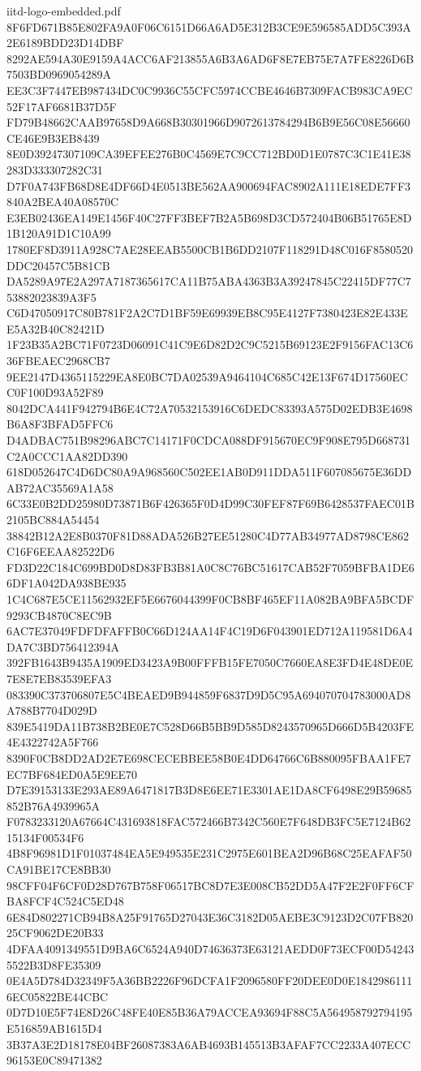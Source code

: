 \begin{filecontents*}[overwrite]{iitd-logo-embedded.pdf}
8F6FD671B85E802FA9A0F06C6151D66A6AD5E312B3CE9E596585ADD5C393A2E6189BDD23D14DBF
8292AE594A30E9159A4ACC6AF213855A6B3A6AD6F8E7EB75E7A7FE8226D6B7503BD0969054289A
EE3C3F7447EB987434DC0C9936C55CFC5974CCBE4646B7309FACB983CA9EC52F17AF6681B37D5F
FD79B48662CAAB97658D9A668B30301966D9072613784294B6B9E56C08E56660CE46E9B3EB8439
8E0D39247307109CA39EFEE276B0C4569E7C9CC712BD0D1E0787C3C1E41E38283D333307282C31
D7F0A743FB68D8E4DF66D4E0513BE562AA900694FAC8902A111E18EDE7FF3840A2BEA40A08570C
E3EB02436EA149E1456F40C27FF3BEF7B2A5B698D3CD572404B06B51765E8D1B120A91D1C10A99
1780EF8D3911A928C7AE28EEAB5500CB1B6DD2107F118291D48C016F8580520DDC20457C5B81CB
DA5289A97E2A297A7187365617CA11B75ABA4363B3A39247845C22415DF77C753882023839A3F5
C6D47050917C80B781F2A2C7D1BF59E69939EB8C95E4127F7380423E82E433EE5A32B40C82421D
1F23B35A2BC71F0723D06091C41C9E6D82D2C9C5215B69123E2F9156FAC13C636FBEAEC2968CB7
9EE2147D4365115229EA8E0BC7DA02539A9464104C685C42E13F674D17560ECC0F100D93A52F89
8042DCA441F942794B6E4C72A70532153916C6DEDC83393A575D02EDB3E4698B6A8F3BFAD5FFC6
D4ADBAC751B98296ABC7C14171F0CDCA088DF915670EC9F908E795D668731C2A0CCC1AA82DD390
618D052647C4D6DC80A9A968560C502EE1AB0D911DDA511F607085675E36DDAB72AC35569A1A58
6C33E0B2DD25980D73871B6F426365F0D4D99C30FEF87F69B6428537FAEC01B2105BC884A54454
38842B12A2E8B0370F81D88ADA526B27EE51280C4D77AB34977AD8798CE862C16F6EEAA82522D6
FD3D22C184C699BD0D8D83FB3B81A0C8C76BC51617CAB52F7059BFBA1DE66DF1A042DA938BE935
1C4C687E5CE11562932EF5E6676044399F0CB8BF465EF11A082BA9BFA5BCDF9293CB4870C8EC9B
6AC7E37049FDFDFAFFB0C66D124AA14F4C19D6F043901ED712A119581D6A4DA7C3BD756412394A
392FB1643B9435A1909ED3423A9B00FFFB15FE7050C7660EA8E3FD4E48DE0E7E8E7EB83539EFA3
083390C373706807E5C4BEAED9B944859F6837D9D5C95A694070704783000AD8A788B7704D029D
839E5419DA11B738B2BE0E7C528D66B5BB9D585D8243570965D666D5B4203FE4E4322742A5F766
8390F0CB8DD2AD2E7E698CECEBBEE58B0E4DD64766C6B880095FBAA1FE7EC7BF684ED0A5E9EE70
D7E39153133E293AE89A6471817B3D8E6EE71E3301AE1DA8CF6498E29B59685852B76A4939965A
F0783233120A67664C431693818FAC572466B7342C560E7F648DB3FC5E7124B6215134F00534F6
4B8F96981D1F01037484EA5E949535E231C2975E601BEA2D96B68C25EAFAF50CA91BE17CE8BB30
98CFF04F6CF0D28D767B758F06517BC8D7E3E008CB52DD5A47F2E2F0FF6CFBA8FCF4C524C5ED48
6E84D802271CB94B8A25F91765D27043E36C3182D05AEBE3C9123D2C07FB82025CF9062DE20B33
4DFAA4091349551D9BA6C6524A940D74636373E63121AEDD0F73ECF00D542435522B3D8FE35309
0E4A5D784D32349F5A36BB2226F96DCFA1F2096580FF20DEE0D0E18429861116EC05822BE44CBC
0D7D10E5F74E8D26C48FE40E85B36A79ACCEA93694F88C5A564958792794195E516859AB1615D4
3B37A3E2D18178E04BF26087383A6AB4693B145513B3AFAF7CC2233A407ECC96153E0C89471382

\end{filecontents*}
